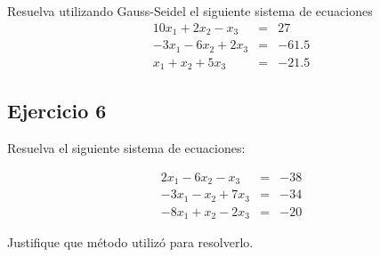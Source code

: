 \documentclass[a4paper,11pt]{article}
\theoremstyle{mytheor}
\begin{document}
Resuelva utilizando Gauss-Seidel el siguiente sistema de ecuaciones 
$$\begin{array}{ccc}
10x_1 +2x_2 - x_3 	&=& 27\\
-3x_1 -6x_2 + 2x_3 	&=& -61.5\\
x_1+x_2+ 5x_3 		&=& -21.5
\end{array}$$

\subsection*{Ejercicio 6}

Resuelva el siguiente sistema de ecuaciones:

$$\begin{array}{ccc}
2x_1 -6x_2 -x_3 &=& -38\\
-3x_1-x_2+7x_3 &=& -34\\
-8x_1 +x_2-2x_3 &=& -20
\end{array}$$

Justifique que método utilizó para resolverlo.
\end{document}
